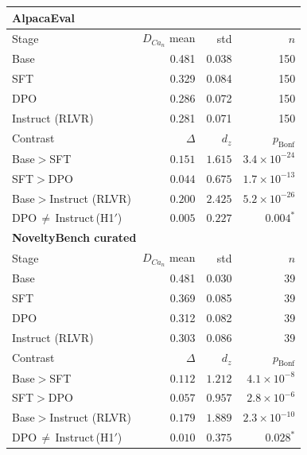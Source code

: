 \begin{tabular}{lrrr}
\toprule
\multicolumn{4}{l}{\textbf{AlpacaEval}} \\
\midrule
Stage & $D_{Ca_n}$ mean & std & $n$ \\
\quad Base & 0.481 & 0.038 & 150 \\
\quad SFT & 0.329 & 0.084 & 150 \\
\quad DPO & 0.286 & 0.072 & 150 \\
\quad Instruct (RLVR) & 0.281 & 0.071 & 150 \\
\addlinespace
Contrast & $\Delta$ & $d_z$ & $p_{\mathrm{Bonf}}$ \\
\quad Base$>$SFT & $0.151$ & $1.615$ & $3.4 \times 10^{-24}$ \\
\quad SFT$>$DPO & $0.044$ & $0.675$ & $1.7 \times 10^{-13}$ \\
\quad Base$>$Instruct (RLVR) & $0.200$ & $2.425$ & $5.2 \times 10^{-26}$ \\
\quad DPO$\,\neq\,$Instruct\,(H1$'$) & $0.005$ & $0.227$ & $0.004^{*}$ \\
\midrule
\multicolumn{4}{l}{\textbf{NoveltyBench curated}} \\
\midrule
Stage & $D_{Ca_n}$ mean & std & $n$ \\
\quad Base & 0.481 & 0.030 & 39 \\
\quad SFT & 0.369 & 0.085 & 39 \\
\quad DPO & 0.312 & 0.082 & 39 \\
\quad Instruct (RLVR) & 0.303 & 0.086 & 39 \\
\addlinespace
Contrast & $\Delta$ & $d_z$ & $p_{\mathrm{Bonf}}$ \\
\quad Base$>$SFT & $0.112$ & $1.212$ & $4.1 \times 10^{-8}$ \\
\quad SFT$>$DPO & $0.057$ & $0.957$ & $2.8 \times 10^{-6}$ \\
\quad Base$>$Instruct (RLVR) & $0.179$ & $1.889$ & $2.3 \times 10^{-10}$ \\
\quad DPO$\,\neq\,$Instruct\,(H1$'$) & $0.010$ & $0.375$ & $0.028^{*}$ \\
\bottomrule
\end{tabular}
